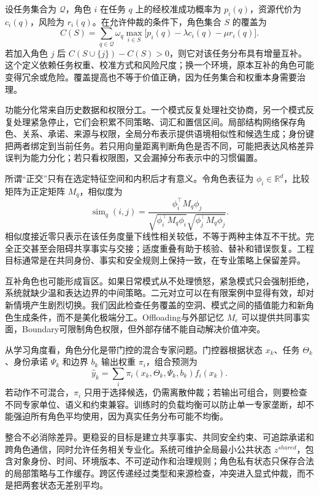 设任务集合为 $\mathcal Q$，角色 $i$ 在任务 $q$ 上的经校准成功概率为 $p_i(q)$，资源代价为 $c_i(q)$，风险为 $r_i(q)$。在允许仲裁的条件下，角色集合 $S$ 的覆盖为
\[
C(S)=\sum_{q\in\mathcal Q}\omega_q
\max_{i\in S}\bigl[p_i(q)-\lambda c_i(q)-\mu r_i(q)\bigr].
\]
若加入角色 $j$ 后 $C(S\cup\{j\})-C(S)>0$，则它对该任务分布具有增量互补。这个定义依赖任务权重、校准方式和风险尺度；换一个环境，原本互补的角色可能变得冗余或危险。覆盖提高也不等于价值正确，因为任务集合和权重本身需要治理。

功能分化常来自历史数据和权限分工。一个模式反复处理社交协商，另一个模式反复处理紧急停止，它们会积累不同策略、词汇和置信区间。局部结构网络保存角色、关系、承诺、来源与权限，全局分布表示提供语境相似性和候选生成；身份键把两者绑定到当前任务。若只用向量距离判断角色是否不同，可能把表达风格差异误判为能力分化；若只看权限图，又会漏掉分布表示中的习惯偏置。

所谓“正交”只有在选定特征空间和内积后才有意义。令角色表征为 $\phi_i\in\mathbb R^d$，比较矩阵为正定矩阵 $M_q$，相似度为
\[
\operatorname{sim}_q(i,j)=
\frac{\phi_i^\top M_q\phi_j}
{\sqrt{\phi_i^\top M_q\phi_i}
\sqrt{\phi_j^\top M_q\phi_j}}.
\]
相似度接近零只表示在该任务度量下线性相关较低，不等于两种主体互不干扰。完全正交甚至会阻碍共享事实与交接；适度重叠有助于核验、替补和错误恢复。工程目标通常是在共同身份、事实和安全规则上保持一致，在专业策略上保留差异。

互补角色也可能形成盲区。如果日常模式从不处理愤怒，紧急模式只会强制拒绝，系统就缺少温和表达边界的中间策略。二元对立可以在有限案例中显得有效，却对新情境产生剧烈切换。我们因此检查任务覆盖的空洞、模式之间的插值能力和新角色生成条件，而不是美化极端分工。Offloading与外部记忆 $M_e$ 可以提供共同事实面，Boundary可限制角色权限，但外部存储不能自动解决价值冲突。

从学习角度看，角色分化是带门控的混合专家问题。门控器根据状态 $x_k$、任务 $\Theta_k$、身份承诺 $\Psi_k$ 和边界 $b_k$ 输出权重 $\pi_i$，组合预测为
\[
\hat y_k=\sum_i\pi_i(x_k,\Theta_k,\Psi_k,b_k)f_i(x_k).
\]
若动作不可混合，$\pi_i$ 只用于选择候选，仍需离散仲裁；若输出可组合，则要检查不同专家单位、语义和约束兼容。训练时的负载均衡可以防止单一专家垄断，却不能强迫所有角色平均使用，因为真实任务分布可能不均衡。

整合不必消除差异。更稳妥的目标是建立共享事实、共同安全约束、可追踪承诺和跨角色通信，同时允许任务相关专业化。系统可维护全局最小公共状态 $z^{shared}$，包含对象身份、时间、环境版本、不可逆动作和治理规则；角色私有状态只保存合法的局部策略与工作缓存。跨区传递经过类型和来源检查，冲突进入显式仲裁，而不是把两套状态无差别平均。

